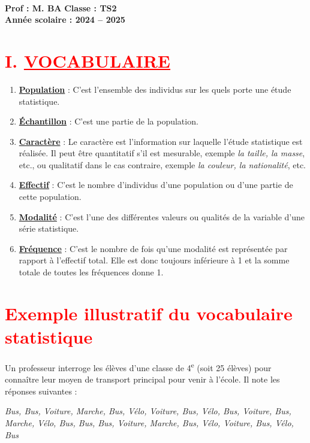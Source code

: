 \documentclass[12pt,a4paper]{article}
\newcounter{exemple} %
\begin{document}
\begin{center}
    \Large{}\\[-0.1cm]
    \normalsize\textbf{Prof : M. BA} \hfill \textbf{Classe : TS2}\\[-0.1cm]
    \textbf{Année scolaire : 2024 -- 2025}
\end{center}

\section*{\textcolor{red}{I. \underline{VOCABULAIRE}}}

\begin{enumerate}
    \item \textbf{\underline{Population}} : C’est l’ensemble des individus sur les quels porte une étude statistique.
    \item \textbf{\underline{Échantillon}} : C’est une partie de la population.
    \item \textbf{\underline{Caractère}} : Le caractère est l’information sur laquelle l’étude statistique est réalisée. Il peut être quantitatif s’il est mesurable, exemple \textit{la taille, la masse}, etc., ou qualitatif dans le cas contraire, exemple \textit{la couleur, la nationalité}, etc.
    \item \textbf{\underline{Effectif}} : C’est le nombre d’individus d’une population ou d’une partie de cette population.
    \item \textbf{\underline{Modalité}} : C’est l’une des différentes valeurs ou qualités de la variable d’une série statistique.
    \item \textbf{\underline{Fréquence}} : C’est le nombre de fois qu’une modalité est représentée par rapport à l’effectif total. Elle est donc toujours inférieure à 1 et la somme totale de toutes les fréquences donne 1.
\end{enumerate}

\section*{\textcolor{red}{Exemple illustratif du vocabulaire statistique}}

\begin{tcolorbox}[colback=gray!5, colframe=black, title=\textbf{Situation}]
Un professeur interroge les élèves d’une classe de 4\textsuperscript{e} (soit 25 élèves) pour connaître leur moyen de transport principal pour venir à l’école. Il note les réponses suivantes :
\begin{center}
\textit{Bus, Bus, Voiture, Marche, Bus, Vélo, Voiture, Bus, Vélo, Bus, Voiture, Bus, Marche, Vélo, Bus, Bus, Bus, Voiture, Marche, Bus, Vélo, Voiture, Bus, Vélo, Bus}
\end{center}
\end{tcolorbox}
\end{document}
